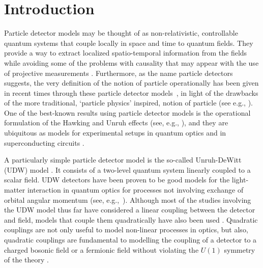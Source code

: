 \documentclass[prd,twocolumn,superscriptaddress,nofootinbib,floatfix,amsmath,amssymb]{revtex4-2}
\begin{document}
\maketitle



\section{Introduction}
    


    Particle detector models may be thought of as non-relativistic, controllable quantum systems that couple locally in space and time to quantum fields.  They provide a way to extract localized spatio-temporal information from the fields while avoiding some of the problems with causality that may appear with the use of projective measurements \cite{sorkin1956,Dowker2011UselessQ,Benincasa2014projective}. Furthermore, as the name particle detectors suggests, the very definition of the notion of particle operationally has been given in recent times through these particle detector models~\cite{Wald1984accel,Earman2011}, in light of the drawbacks of the more traditional, `particle physics' inspired, notion of particle (see e.g., \cite{Lamb1995}). One of the best-known results using particle detector models is the operational formulation of the Hawking and Unruh effects (see, e.g., \cite{Unruh1979evaporation,Candelas1977irreversible,Crispino2008review}), and they are ubiquitous as models for experimental setups in quantum optics \cite{Scully1997book,boyd2008nonlinear} and in superconducting circuits \cite{Wallraff2004superconducting}. 
    
    A particularly simple particle detector model is the so-called Unruh-DeWitt (UDW) model \cite{Unruh1979evaporation,DeWitt1979}. It consists of a two-level quantum system linearly coupled to a scalar field. UDW detectors have been proven to be good models for the light-matter interaction in quantum optics for processes not involving  exchange of orbital angular momentum (see, e.g.,~\cite{Pablo2018rqo,Pozas2016}). Although most of the studies involving the UDW model thus far have considered a linear coupling between the detector and field, models that couple them quadratically have also been used \cite{Takagi1985detector,Takagi1986noise,Iyer1980dirac,Hummer2016,Jorma2016fermionic,Allison2017a,Allison:2018multi}. Quadratic couplings are not only useful to model non-linear processes in optics, but also, quadratic couplings are fundamental to modelling the coupling of a detector to a charged bosonic field or a fermionic field without violating the $U(1)$ symmetry of the theory \cite{Hummer2016}.
\end{document}
